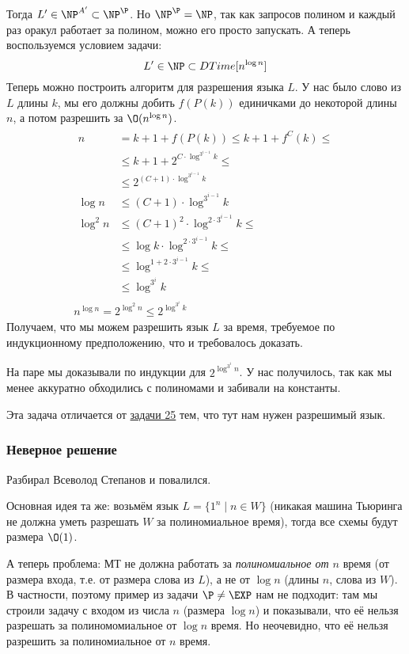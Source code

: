 	Тогда $L' \in \NP^{A'} \subset \NP^\P$.
	Но $\NP^\P=\NP$, так как запросов полином и каждый раз оракул работает за полином, можно его просто запускать.
	А теперь воспользуемся условием задачи:
	\[ L' \in \NP \subset DTime[n^{\log n}] \]
	Теперь можно построить алгоритм для разрешения языка $L$.
	У нас было слово из $L$ длины $k$, мы его должны добить $f(P(k))$ единичками до некоторой длины $n$, а потом разрешить за $\O(n^{\log n})$.
	\begin{gather*}
		\begin{aligned}
			n &= k + 1 + f(P(k)) \le k + 1 + f^C(k) \le \\
			  &\le k + 1 + 2^{C \cdot \log^{3^{i-1}} k} \le \\
			  &\le 2^{(C+1) \cdot \log^{3^{i-1}} k} \\
			\log n &\le (C+1) \cdot \log^{3^{i-1}} k \\
			\log^2 n &\le (C+1)^2 \cdot \log^{2\cdot3^{i-1}} k \le \\
			         &\le \log k \cdot \log^{2\cdot3^{i-1}} k \le \\
			         &\le \log^{1+2\cdot3^{i-1}} k \le \\
			         &\le \log^{3^i} k
		\end{aligned} \\
		n^{\log n} = 2^{\log^2n} \le 2^{\log^{3^i} k}
	\end{gather*}
	Получаем, что мы можем разрешить язык $L$ за время, требуемое по индукционному предположению,
	что и требовалось доказать.
	
	\begin{Rem}
		На паре мы доказывали по индукции для $2^{\log^{3^i} n}$.
		У нас получилось, так как мы менее аккуратно обходились с полиномами и забивали на константы.
	\end{Rem}

	Эта задача отличается от \hyperref[prob25]{задачи 25} тем, что тут нам нужен разрешимый язык.
	\subsubsection{Неверное решение}
		Разбирал Всеволод Степанов и повалился.

		Основная идея та же: возьмём язык $L=\{1^n \mid n \in W\}$ (никакая машина Тьюринга не должна уметь разрешать $W$ за полиномиальное время),
		тогда все схемы будут размера $\O(1)$.

		А теперь проблема: МТ не должна работать за \textit{полиномиальное от $n$} время (от размера входа,
		т.е. от размера слова из $L$), а не от $\log n$ (длины $n$, слова из $W$).
		В частности, поэтому пример из задачи $\P \neq \EXP$ нам не подходит:
		там мы строили задачу с входом из числа $n$ (размера $\log n$) и показывали,
		что её нельзя разрешать за полиномомиальное от $\log n$ время.
		Но неочевидно, что её нельзя разрешить за полиномиальное от $n$ время.

